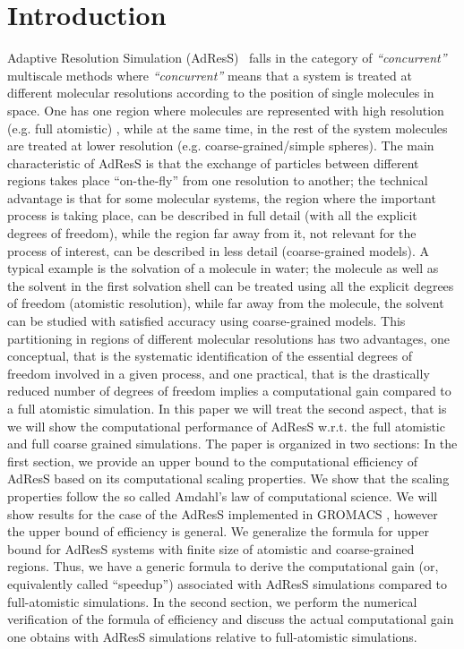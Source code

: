 \documentclass[a4paper,preprint,unsortedaddress]{revtex4-1}
\begin{document}
\section{Introduction}
Adaptive Resolution Simulation (AdResS)~\cite{adress1, adress2} falls in the category of {\it ``concurrent''} multiscale methods where {\it ``concurrent''} means that a system is treated at different molecular resolutions according to the position of single molecules in space. One has one region where molecules are represented with high resolution (e.g. full atomistic) , while at the same time, in the rest of the system molecules are treated at lower resolution (e.g. coarse-grained/simple spheres).
The main characteristic of AdResS is that the exchange of particles between different regions takes place ``on-the-fly'' from one resolution to another; the technical advantage is that for some molecular systems, the region 
where the important process is taking place,  can be described in full detail (with all the explicit degrees of freedom), while 
the region far away from it, not relevant for the process of interest, can be described in less detail (coarse-grained models). A typical example is the solvation of a molecule in water; the molecule as 
well as the solvent in the first solvation shell can be treated using all the explicit degrees of freedom (atomistic resolution), 
while far away from the molecule, the solvent can be studied with satisfied accuracy using coarse-grained models. This partitioning in regions 
of different molecular resolutions has two advantages, one conceptual, that is the systematic identification of the essential degrees of freedom 
involved in a given process, and one practical, that is the drastically reduced number of degrees of freedom implies a computational gain compared to a full atomistic simulation. 
In this paper we will treat the second aspect, that is we will show the computational performance of AdResS w.r.t. the full atomistic and full coarse grained simulations. 
The paper is organized in two sections: In the first section, we provide an upper bound to the computational efficiency of AdResS based on its computational 
scaling properties. We show that the scaling properties follow the so called Amdahl's law of computational science. We will show results for the case of the AdResS 
implemented in GROMACS \cite{gromacs}, however the upper bound of efficiency is general. We generalize the formula for upper bound for AdResS systems with 
finite size of atomistic and coarse-grained regions. Thus, we have a generic formula to derive the computational gain (or, equivalently called ``speedup'') associated with AdResS simulations
compared to full-atomistic simulations. 
In the second section, we perform the numerical verification of the formula of efficiency and discuss the actual computational gain one obtains with AdResS simulations relative to full-atomistic simulations. 
\end{document}
